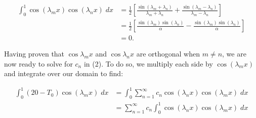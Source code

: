 \begin{solution}
    \begin{align*}
        \int_{0}^{1}{\cos{(\lambda_m x)}\cos{(\lambda_n x)}\; dx} &= \frac{1}{2} \left[ \frac{\sin{(\lambda_m + \lambda_n)}}{\lambda_m + \lambda_n} + \frac{\sin{(\lambda_m - \lambda_n)}}{\lambda_m - \lambda_n} \right] \\
                                                                  &= \frac{1}{2} \left[ \frac{\sin{(\lambda_m)} \sin{(\lambda_n)}}{\alpha} - \frac{\sin{(\lambda_m)} \sin{(\lambda_n)}}{\alpha} \right] \\
                                                                  &= 0.
    \end{align*}

    \pagebreak
    Having proven that $\cos{\lambda_m x}$ and $\cos{\lambda_n x}$ are orthogonal when $m \neq n$, we are now ready to solve for $c_n$ in (2).
    To do so, we multiply each side by $\cos{(\lambda_m x)}$ and integrate over our domain to find:

    \begin{align*}
        \int_{0}^{1}{(20 - T_0) \cos{(\lambda_m x)}\; dx} &= \int_{0}^{1}{\sum_{n=1}^{\infty}{c_n \cos{(\lambda_n x)}} \cos{(\lambda_m x)}\; dx} \\
                                                          &= \sum_{n=1}^{\infty}{c_n  \int_{0}^{1}{\cos{(\lambda_n x)} \cos{(\lambda_m x)}\; dx} }
    \end{align*}
\end{solution}